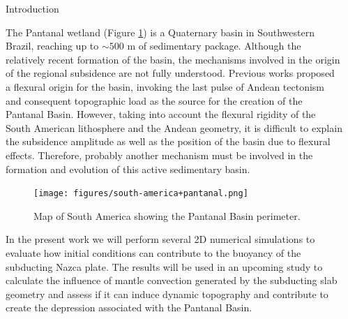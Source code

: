 \documentclass[final]{beamer}
\newlength{\sepwidth}
\newlength{\colwidth}
\newcommand{\separatorcolumn}{\begin{column}{\sepwidth}\end{column}}
\begin{document}


\begin{frame}[t]


\begin{columns}[t]
\separatorcolumn

\begin{column}{\colwidth}
  \begin{block}{Introduction}

    The Pantanal wetland (Figure \ref{fig:pantanal-basin}) is a Quaternary basin in Southwestern Brazil, reaching up to $\sim500$ m of sedimentary package. Although the relatively recent formation of the basin, the mechanisms involved in the origin of the regional subsidence are not fully understood. Previous works proposed a flexural origin for the basin, invoking the last pulse of Andean tectonism and consequent topographic load as the source for the creation of the Pantanal Basin. However, taking into account the flexural rigidity of the South American lithosphere and the Andean geometry, it is difficult to explain the subsidence amplitude as well as the position of the basin due to flexural effects. Therefore, probably another mechanism must be involved in the formation and evolution of this active sedimentary basin. 

    \begin{figure}
        \centering
        \texttt{[image: figures/south-america+pantanal.png]}
        \caption{ Map of South America showing the Pantanal Basin perimeter.}
        \label{fig:pantanal-basin}
    \end{figure}

    In the present work we will perform several 2D numerical simulations to evaluate how initial conditions can contribute to the buoyancy of the subducting Nazca plate. The results will be used in an upcoming study to calculate the influence of mantle convection generated by the subducting slab geometry and assess if it can induce dynamic topography and contribute to create the depression associated with the Pantanal Basin. 


\end{block}
\end{column}
\end{columns}
\end{frame}
\end{document}
